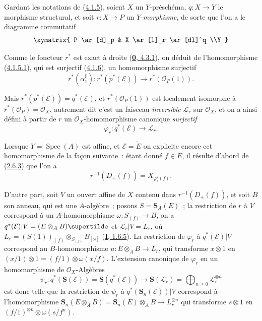 \begin{env}[4.2.1]
\label{II.4.2.1-fr}
Gardant les notations de (\hyperref[II.4.1.5-fr]{4.1.5}), soient $X$ un
$Y$-préschéma, $q:X\to Y$ le morphisme structural, et soit $r:X\to P$ un
$Y$-\emph{morphisme}, de sorte que l'on a le diagramme commutatif
\[
  \xymatrix{
    P \ar[d]_p & X \ar[l]_r \ar[dl]^q
    \\Y
  }
\]


Comme le foncteur $r^*$ est exact à droite
(\hyperref[0.4.3.1-fr]{\textbf{0}, 4.3.1}), on déduit de l'homomorphisme
(\hyperref[II.4.1.5.1-fr]{4.1.5.1}), qui est surjectif
(\hyperref[II.4.1.6-fr]{4.1.6}), un homomorphisme surjectif
\[
  r^*(\alpha_1^\sharp):r^*(p^*(\mathcal{E}))\longrightarrow
  r^*(\mathcal{O}_P(1)).
\]

Mais $r^*(p^*(\mathcal{E}))=q^*(\mathcal{E})$, et
$r^*(\mathcal{O}_P(1))$ est localement isomorphe à
$r^*(\mathcal{O}_P)=\mathcal{O}_X$, autrement dit c'est un faisceau
\emph{inversible} $\mathcal{L}_r$ sur $\mathcal{O}_X$, et on a ainsi défini à partir
de $r$ un $\mathcal{O}_X$-homomorphisme canonique \emph{surjectif}
\[
\label{II.4.2.1.1-fr}
  \varphi_r:q^*(\mathcal{E})\longrightarrow\mathcal{L}_r.
\tag{4.2.1.1}
\]

Lorsque $Y=\operatorname{Spec}(A)$ est affine, et
$\mathcal{E}=\widetilde{E}$ on explicite encore cet homomorphisme de la façon
suivante~: étant donné $f\in E$, il résulte d'abord de
(\hyperref[II.2.6.3-fr]{2.6.3}) que l'on a
\[
\label{II.4.2.1.2-fr}
  r^{-1}(D_+(f))=X_{\varphi_r^\flat(f)}.
\tag{4.2.1.2}
\]

D'autre part, soit $V$ un ouvert affine de $X$ contenu dans
$r^{-1}(D_+(f))$, et soit $B$ son anneau, qui est une $A$-algèbre~; posons
$S=\mathbf{S}_A(E)$~; la restriction de $r$ à $V$ correspond à un
$A$-homomorphisme $\omega:S_{(f)}\to B$, on a
$q^*(\mathcal{E})|V=(E\otimes_A B)\supertilde$ et
$\mathcal{L}_r|V=\widetilde{L}_r$, où
$L_r=(S(1))_{(f)}\otimes_{S_{(f)}}B_{[\omega]}$
(\hyperref[I.1.6.5-fr]{\textbf{I}, 1.6.5}). La restriction de $\varphi_r$ à
$q^*(\mathcal{E})|V$ correspond au $B$-homomorphisme
$u:E\otimes_A B\to L_r$, qui transforme $x\otimes1$ en
$(x/1)\otimes1=(f/1)\otimes\omega(x/f)$. L'extension canonique de
$\varphi_r$ en un homomorphisme de $\mathcal{O}_X$-Algèbres
\[
  \psi_r:q^*(\mathbf{S}(\mathcal{E}))=
  \mathbf{S}(q^*(\mathcal{E}))\longrightarrow
  \mathbf{S}(\mathcal{L}_r)=\bigoplus_{n\geq0}\mathcal{L}_r^{\otimes n}
\]
est donc telle que la restriction de $\psi_r$ à
$q^*(\mathbf{S}_n(\mathcal{E}))|V$ correspond à l'homomorphisme
$\mathbf{S}_n(E\otimes_A B)=\mathbf{S}_n(E)\otimes_A B\to L_r^{\otimes n}$
qui transforme $s\otimes1$ en
$(f/1)^{\otimes n}\otimes\omega(s/f^n)$.
\end{env}

